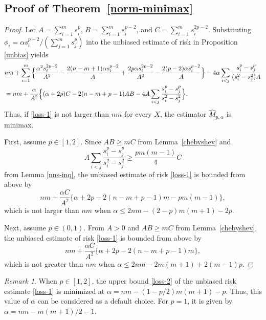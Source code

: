 \documentclass[11pt, a4paper]{article}
\theoremstyle{remark}
\newtheorem{remark}{Remark}
\begin{document}
\subsection{Proof of Theorem~\ref{norm-minimax}}
\begin{proof}
    Let $A=\sum_{i=1}^ms_i^p$, $B=\sum_{i=1}^ms_i^{p-2}$, and $C=\sum_{i=1}^ms_i^{2p-2}$. 
    Substituting $\phi_i=\alpha s_i^{p-2}/(\sum_{j=1}^ms_j^p)$ into the unbiased estimate of risk in Proposition \ref{unbias} yields
\begin{align}
   &nm+\sum_{i=1}^m\Big\{\frac{\alpha^2 s_i^{2p-2}}{A^2}-\frac{2(n-m+1)\alpha s_i^{p-2}}{A}+\frac{2p\alpha s_i^{2p-2}}{A^2}-\frac{2(p-2)\alpha s_i^{p-2}}{A} \Big\}-4\alpha\sum_{i<j}\frac{ s_i^p- s_j^p}{( s_i^2- s_j^2)A} \notag\\
   &=nm+\frac{\alpha}{A^2}\Big\{(\alpha+2p) C-2(n-m+p-1)AB-4A\sum_{i<j}\frac{ s_i^p- s_j^p}{ s_i^2- s_j^2}\Big\}.\label{loss-1}
\end{align}
   Thus, if \eqref{loss-1} is not larger than $nm$ for every $X$, the estimator $\hat{M}_{p,\alpha}$ is minimax.

First, assume $p\in[1,2]$.
Since $AB\ge mC$ from Lemma~\ref{chebyshev} and
$$A\sum_{i<j}\frac{ s_i^p- s_j^p}{ s_i^2- s_j^2}\ge\frac{pm(m-1)}{4}C$$
from Lemma \ref{nns-inq}, the unbiased estimate of risk \eqref{loss-1} is bounded from above by
\begin{equation}
    nm+\frac{\alpha C}{A^2}\Big\{\alpha+2p-2(n-m+p-1)m-pm(m-1)\Big\}, \label{loss-2}
\end{equation}
which is not larger than $nm$ when $\alpha\le 2nm-(2-p)m(m+1)-2p$.

Next, assume $p\in(0,1)$.
From $A>0$ and $AB\ge mC$ from Lemma~\ref{chebyshev}, the unbiased estimate of risk \eqref{loss-1} is bounded from above by
\begin{equation}
    nm+\frac{\alpha C}{A^2}\Big\{\alpha+2p-2(n-m+p-1)m\Big\}, \label{loss-3}
\end{equation}
which is not greater than $nm$ when $\alpha\le 2nm-2m(m+1)+2(m-1)p.$
\end{proof}

\begin{remark}
When $p\in[1,2]$, the upper bound \eqref{loss-2} of the unbiased risk estimate \eqref{loss-1} is minimized at $\alpha=nm-(1-p/2)m(m+1)-p.$ 
Thus, this value of $\alpha$ can be considered as a default choice. 
For $p=1$, it is given by $\alpha=nm-m(m+1)/2-1$.
\end{remark}
\end{document}
